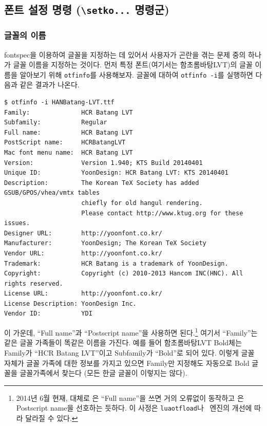 \documentclass[
	12pt,
	a4paper,
	kosection,
	footnote,
	microtype,
	figtabcapt,
]{oblivoir}
\def\cs#1{\texttt{\textbackslash #1}}
\def\util#1{\texttt{#1}}
\def\ct#1{\texttt{#1}}
\newcommand\obclass{ob\-liv\-oir\oblivoirallowbreak}
\begin{document}
\subsection{ 폰트 설정 명령 (\protect\cs{setko...} 명령군)}

\subsubsection{글꼴의 이름}
fontspec을 이용하여 글꼴을 지정하는 데 있어서 사용자가 곤란을 겪는 문제 중의 하나가 글꼴 이름을 
지정하는 것이다. 먼저 특정 폰트(여기서는 함초롬바탕LVT)의 글꼴 이름을 알아보기 위해 \util{otfinfo}를
사용해보자. 글꼴에 대하여 \util{otfinfo -i}를 실행하면 다음과 같은 결과가 나온다.

\begin{footnotesize}
\begin{verbatim}
$ otfinfo -i HANBatang-LVT.ttf
Family:              HCR Batang LVT
Subfamily:           Regular
Full name:           HCR Batang LVT
PostScript name:     HCRBatangLVT
Mac font menu name:  HCR Batang LVT
Version:             Version 1.940; KTS Build 20140401
Unique ID:           YoonDesign: HCR Batang LVT: KTS 20140401
Description:         The Korean TeX Society has added GSUB/GPOS/vhea/vmtx tables 
                     chiefly for old hangul rendering. 
                     Please contact http://www.ktug.org for these issues.
Designer URL:        http://yoonfont.co.kr/
Manufacturer:        YoonDesign; The Korean TeX Society
Vendor URL:          http://yoonfont.co.kr/
Trademark:           HCR Batang is a trademark of YoonDesign.
Copyright:           Copyright (c) 2010-2013 Hancom INC(HNC). All rights reserved.
License URL:         http://yoonfont.co.kr/
License Description: YoonDesign Inc.
Vendor ID:           YDI
\end{verbatim}
\end{footnotesize}
이 가운데, ``Full name''과 ``Postscript name''을 사용하면 된다.\footnote{%
	2014년 6월 현재, 대체로 \XeTeX 은 ``Full name''을 쓰면 거의 오류없이 동작하고
	\LuaTeX 은 Postscript name을 선호하는 듯하다. 이 사정은 \ct{luaotfload}나
	\XeTeX\ 엔진의 개선에 따라 달라질 수 있다.}
여기서 ``Family''는 같은 글꼴 가족들이 똑같은 이름을 가진다. 예를 들어 함초롬바탕LVT Bold체는
Family가 ``HCR Batang LVT''이고 Subfamily가 ``Bold''로 되어 있다. 이렇게 글꼴 자체가 글꼴 가족에 대한 정보를 가지고 있으면 Family만 지정해도 자동으로 Bold 글꼴을 글꼴가족에서 찾는다 (모든 한글 글꼴이 이렇지는 않다).
\end{document}
